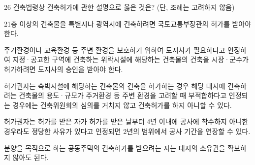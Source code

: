 \begin{question}{26}
건축법령상 건축허가에 관한 설명으로 옳은 것은? (단, 조례는 고려하지 않음)
\begin{choices}
  \item 21층 이상의 건축물을 특별시나 광역시에 건축하려면 국토교통부장관의 허가를 받아야 한다.
  \item 주거환경이나 교육환경 등 주변 환경을 보호하기 위하여 도지사가 필요하다고 인정하여 지정·공고한 구역에 건축하는 위락시설에 해당하는 건축물의 건축을 시장·군수가 허가하려면 도지사의 승인을 받아야 한다.
  \item 허가권자는 숙박시설에 해당하는 건축물의 건축을 허가하는 경우 해당 대지에 건축하려는 건축물의 용도·규모가 주거환경 등 주변 환경을 고려할 때 부적합하다고 인정되는 경우에는 건축위원회의 심의를 거치지 않고 건축허가를 하지 아니할 수 있다.
  \item 허가권자는 허가를 받은 자가 허가를 받은 날부터 4년 이내에 공사에 착수하지 아니한 경우라도 정당한 사유가 있다고 인정되면 2년의 범위에서 공사 기간을 연장할 수 있다.
  \item 분양을 목적으로 하는 공동주택의 건축허가를 받으려는 자는 대지의 소유권을 확보하지 않아도 된다.
\end{choices}
\end{question}
